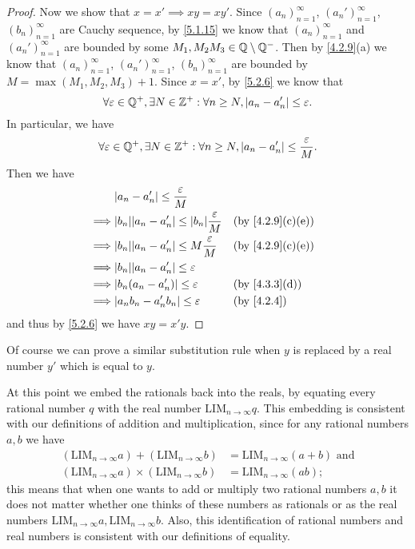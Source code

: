 \begin{proof}
  Now we show that \(x = x' \implies xy = xy'\).
  Since \((a_n)_{n = 1}^\infty\), \((a_n')_{n = 1}^\infty\), \((b_n)_{n = 1}^\infty\) are Cauchy sequence, by \cref{5.1.15} we know that \((a_n)_{n = 1}^\infty\) and \((a_n')_{n = 1}^\infty\) are bounded by some \(M_1, M_2 M_3 \in \mathbb{Q} \setminus \mathbb{Q}^-\).
  Then by \cref{4.2.9}(a) we know that \((a_n)_{n = 1}^\infty\), \((a_n')_{n = 1}^\infty\), \((b_n)_{n = 1}^\infty\) are bounded by \(M = \max(M_1, M_2, M_3) + 1\).
  Since \(x = x'\), by \cref{5.2.6} we know that
  \[
    \forall \varepsilon \in \mathbb{Q}^+, \exists N \in \mathbb{Z}^+ : \forall n \geq N, \left\lvert a_n - a_n'\right\rvert \leq \varepsilon.
  \]
  In particular, we have
  \[
    \forall \varepsilon \in \mathbb{Q}^+, \exists N \in \mathbb{Z}^+ : \forall n \geq N, \left\lvert a_n - a_n'\right\rvert \leq \dfrac{\varepsilon}{M}.
  \]
  Then we have
  \begin{align*}
             & \abs{a_n - a_n'} \leq \dfrac{\varepsilon}{M}                                          \\
    \implies & \abs{b_n} \abs{a_n - a_n'} \leq \abs{b_n} \dfrac{\varepsilon}{M} &  & \by{4.2.9}[c,e] \\
    \implies & \abs{b_n} \abs{a_n - a_n'} \leq M \dfrac{\varepsilon}{M}         &  & \by{4.2.9}[c,e] \\
    \implies & \abs{b_n} \abs{a_n - a_n'} \leq \varepsilon                                           \\
    \implies & \abs{b_n (a_n - a_n')} \leq \varepsilon                          &  & \by{4.3.3}[d]   \\
    \implies & \abs{a_n b_n - a_n' b_n} \leq \varepsilon                        &  & \by{4.2.4}
  \end{align*}
  and thus by \cref{5.2.6} we have \(xy = x'y\).
\end{proof}

\begin{note}
  Of course we can prove a similar substitution rule when \(y\) is replaced by a real number \(y'\) which is equal to \(y\).
\end{note}

\begin{note}
  At this point we embed the rationals back into the reals, by equating every rational number \(q\) with the real number \(\text{LIM}_{n \to \infty} q\).
  This embedding is consistent with our definitions of addition and multiplication, since for any rational numbers \(a, b\) we have
  \begin{align*}
    (\text{LIM}_{n \to \infty} a) + (\text{LIM}_{n \to \infty} b)      & = \text{LIM}_{n \to \infty} (a + b) \text{ and} \\
    (\text{LIM}_{n \to \infty} a) \times (\text{LIM}_{n \to \infty} b) & = \text{LIM}_{n \to \infty} (ab);
  \end{align*}
  this means that when one wants to add or multiply two rational numbers \(a, b\) it does not matter whether one thinks of these numbers as rationals or as the real numbers \(\text{LIM}_{n \to \infty} a, \text{LIM}_{n \to \infty} b\).
  Also, this identification of rational numbers and real numbers is consistent with our definitions of equality.
\end{note}

